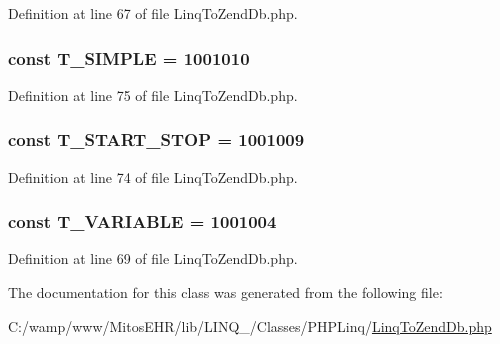 \-Definition at line 67 of file \-Linq\-To\-Zend\-Db.\-php.

\hypertarget{class_p_h_p_linq___linq_to_zend_db_ae326875c3ba0aa2b644725265540cdc3}{
\subsubsection[{\-T\-\_\-\-S\-I\-M\-P\-L\-E}]{\setlength{\rightskip}{0pt plus 5cm}const {\bf \-T\-\_\-\-S\-I\-M\-P\-L\-E} = 1001010}}\label{class_p_h_p_linq___linq_to_zend_db_ae326875c3ba0aa2b644725265540cdc3}


\-Definition at line 75 of file \-Linq\-To\-Zend\-Db.\-php.

\hypertarget{class_p_h_p_linq___linq_to_zend_db_ad11ed6bc65e0073b4c70fc62ed348414}{
\subsubsection[{\-T\-\_\-\-S\-T\-A\-R\-T\-\_\-\-S\-T\-O\-P}]{\setlength{\rightskip}{0pt plus 5cm}const {\bf \-T\-\_\-\-S\-T\-A\-R\-T\-\_\-\-S\-T\-O\-P} = 1001009}}\label{class_p_h_p_linq___linq_to_zend_db_ad11ed6bc65e0073b4c70fc62ed348414}


\-Definition at line 74 of file \-Linq\-To\-Zend\-Db.\-php.

\hypertarget{class_p_h_p_linq___linq_to_zend_db_a50c0f2c8842d4f6810d2671441c86762}{
\subsubsection[{\-T\-\_\-\-V\-A\-R\-I\-A\-B\-L\-E}]{\setlength{\rightskip}{0pt plus 5cm}const {\bf \-T\-\_\-\-V\-A\-R\-I\-A\-B\-L\-E} = 1001004}}\label{class_p_h_p_linq___linq_to_zend_db_a50c0f2c8842d4f6810d2671441c86762}


\-Definition at line 69 of file \-Linq\-To\-Zend\-Db.\-php.



\-The documentation for this class was generated from the following file\-:\begin{DoxyCompactItemize}
\item 
\-C\-:/wamp/www/\-Mitos\-E\-H\-R/lib/\-L\-I\-N\-Q\-\_/\-Classes/\-P\-H\-P\-Linq/\hyperlink{_linq_to_zend_db_8php}{\-Linq\-To\-Zend\-Db.\-php}\end{DoxyCompactItemize}
